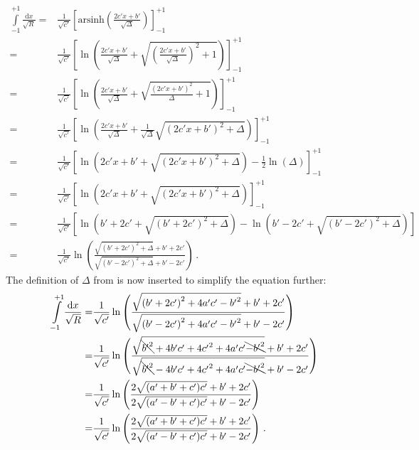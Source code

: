 \begin{align}
    \int\limits_{-1}^{+1} \frac{\mathrm{d}x}{\sqrt{R}}
 =& \frac{1}{\sqrt{c'}} \left[ \mathrm{arsinh}\left( \frac{2 c' x + b'}{\sqrt{\Delta}} \right) \right]_{-1}^{+1} \nonumber \\
 =& \frac{1}{\sqrt{c'}} \left[ \ln \left( \frac{2 c' x + b'}{\sqrt{\Delta}} + \sqrt{ \left(\frac{2 c' x + b'}{\sqrt{\Delta}}\right)^2 + 1} \right) \right]_{-1}^{+1} \nonumber \\
 =& \frac{1}{\sqrt{c'}} \left[ \ln \left( \frac{2 c' x + b'}{\sqrt{\Delta}} + \sqrt{ \frac{ \left(2 c' x + b'\right)^2}{\Delta} + 1} \right) \right]_{-1}^{+1} \nonumber \\
 =& \frac{1}{\sqrt{c'}} \left[ \ln \left( \frac{2 c' x + b'}{\sqrt{\Delta}} + \frac{1}{\sqrt{\Delta}}\sqrt{ \left(2 c' x + b'\right)^2 + \Delta} \right) \right]_{-1}^{+1} \nonumber \\
 =& \frac{1}{\sqrt{c'}} \left[ \ln \left( 2 c' x + b' + \sqrt{ \left(2 c' x + b'\right)^2 + \Delta} \right) - \frac{1}{2} \ln(\Delta) \right]_{-1}^{+1} \nonumber \\
 =& \frac{1}{\sqrt{c'}} \left[ \ln \left( 2 c' x + b' + \sqrt{ \left(2 c' x + b'\right)^2 + \Delta} \right) \right]_{-1}^{+1} \nonumber \\
 =& \frac{1}{\sqrt{c'}} \left[  \ln \left( b' + 2 c' + \sqrt{ \left(b' + 2 c'\right)^2 + \Delta} \right)
                              - \ln \left( b' - 2 c' + \sqrt{ \left(b' - 2 c'\right)^2 + \Delta} \right) \right] \nonumber \\
 =& \frac{1}{\sqrt{c'}} \ln \left( \frac{ \sqrt{ \left(b' + 2 c'\right)^2 + \Delta} + b' + 2 c' }
                                        { \sqrt{ \left(b' - 2 c'\right)^2 + \Delta} + b' - 2 c' } \right) \, .
\end{align}
The definition of $\Delta$ from  is now inserted to simplify the equation further:
\begin{align}
 \int\limits_{-1}^{+1} \frac{\mathrm{d}x}{\sqrt{R}}
 =& \frac{1}{\sqrt{c'}} \ln \left( \frac{ \sqrt{ \left(b' + 2 c'\right)^2 + 4 a' c' - {b'}^2} + b' + 2 c' }
                                        { \sqrt{ \left(b' - 2 c'\right)^2 + 4 a' c' - {b'}^2} + b' - 2 c' } \right) \nonumber \\
 =& \frac{1}{\sqrt{c'}} \ln \left( \frac{ \sqrt{ \bcancel{{b'}^2} + 4 b' c' + 4 {c'}^2 + 4 a' c' \bcancel{- {b'}^2}} + b' + 2 c' }
                                        { \sqrt{ \bcancel{{b'}^2} - 4 b' c' + 4 {c'}^2 + 4 a' c' \bcancel{- {b'}^2}} + b' - 2 c' } \right) \nonumber \\
 =& \frac{1}{\sqrt{c'}} \ln \left( \frac{ 2 \sqrt{ (a' + b' + c') c' } + b' + 2 c' }
                                        { 2 \sqrt{ (a' - b' + c') c' } + b' - 2 c' } \right) \nonumber \\
 =& \frac{1}{\sqrt{c'}} \ln \left( \frac{ 2 \sqrt{ (a' + b' + c') c' } + b' + 2 c' }
                                        { 2 \sqrt{ (a' - b' + c') c' } + b' - 2 c' } \right) \, . \label{eqn:t0_almost}
\end{align}
